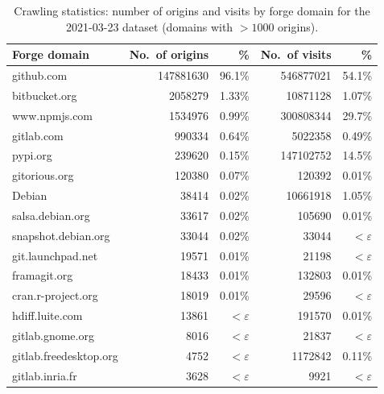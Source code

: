 \begin{table}
  \caption{Crawling statistics: number of origins and visits by forge domain
  for the 2021-03-23 dataset (domains with $>1000$ origins).}
  \label{tab:visits-by-domain}
  \centering
  \begin{tabular}{l|rr|rr}
    \textbf{Forge domain}
    & \textbf{No.~of origins} & \textbf{\%}
    & \textbf{No.~of visits} & \textbf{\%} \\
    \hline
        github.com                & \num{147881630} & 96.1\%      & \num{546877021}  & 54.1\% \\
        bitbucket.org             & \num{2058279}   & 1.33\%      & \num{10871128}   & 1.07\% \\
        www.npmjs.com             & \num{1534976}   & 0.99\%      & \num{300808344}  & 29.7\% \\
        gitlab.com                & \num{990334}    & 0.64\%      & \num{5022358}    & 0.49\% \\
        pypi.org                  & \num{239620}    & 0.15\%      & \num{147102752}  & 14.5\% \\
        gitorious.org             & \num{120380}    & 0.07\%      & \num{120392}     & 0.01\% \\
        Debian                    & \num{38414}     & 0.02\%      & \num{10661918}   & 1.05\% \\
        salsa.debian.org          & \num{33617}     & 0.02\%      & \num{105690}     & 0.01\% \\
        snapshot.debian.org       & \num{33044}     & 0.02\%      & \num{33044}      & $<\varepsilon$ \\
        git.launchpad.net         & \num{19571}     & 0.01\%      & \num{21198}      & $<\varepsilon$ \\
        framagit.org              & \num{18433}     & 0.01\%      & \num{132803}     & 0.01\% \\
        cran.r-project.org        & \num{18019}     & 0.01\%      & \num{29596}      & $<\varepsilon$ \\
        hdiff.luite.com           & \num{13861}     & $<\varepsilon$ & \num{191570}     & 0.01\% \\
        gitlab.gnome.org          & \num{8016}      & $<\varepsilon$ & \num{21837}      & $<\varepsilon$ \\
        gitlab.freedesktop.org    & \num{4752}      & $<\varepsilon$ & \num{1172842}    & 0.11\% \\
        gitlab.inria.fr           & \num{3628}      & $<\varepsilon$ & \num{9921}       & $<\varepsilon$ \\

\end{tabular}
\end{table}
